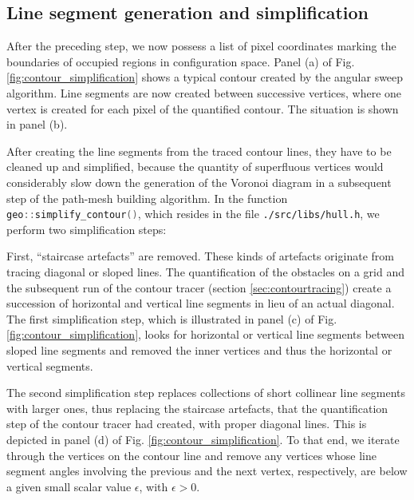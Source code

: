 \subsection{Line segment generation and simplification}
\label{sec:line_seg_generation}
After the preceding step, we now possess a list of pixel coordinates marking the boundaries of occupied regions
in configuration space.
Panel (a) of Fig. \ref{fig:contour_simplification} shows a typical contour created by the angular sweep algorithm.
Line segments are now created between successive vertices, where one vertex is created for each pixel of the
quantified contour. The situation is shown in panel (b).

After creating the line segments from the traced contour lines, they have to be cleaned up and simplified,
because the quantity of superfluous vertices would considerably slow down the generation of the Voronoi 
diagram in a subsequent step of the path-mesh building algorithm.
In the function \lstinline[language=C++]|geo::simplify_contour()|, which resides in the file \lstinline|./src/libs/hull.h|,
we perform two simplification steps:

First, ``staircase artefacts'' are removed. These kinds of artefacts originate from tracing diagonal or sloped lines.
The quantification of the obstacles on a grid and the subsequent run of the contour tracer (section \ref{sec:contourtracing})
create a succession of horizontal and vertical line segments in lieu of an actual diagonal.
The first simplification step, which is illustrated in panel (c) of Fig. \ref{fig:contour_simplification}, looks
for horizontal or vertical line segments between sloped line segments and removed the inner vertices and thus the
horizontal or vertical segments.

The second simplification step replaces collections of short collinear line segments with larger ones,
thus replacing the staircase artefacts, that the quantification step of the contour tracer had created,
with proper diagonal lines. This is depicted in panel (d) of Fig. \ref{fig:contour_simplification}.
To that end, we iterate through the vertices on the contour line and remove any vertices whose line segment angles
involving the previous and the next vertex, respectively, are below a given small scalar value $\epsilon$, with $\epsilon > 0$.


